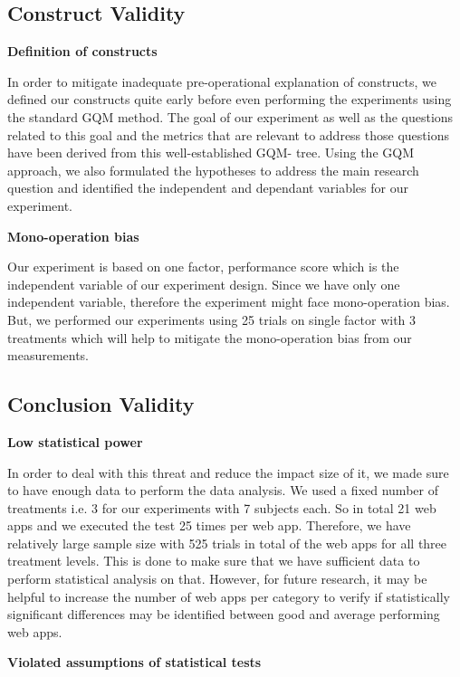 \subsection{Construct Validity}

\textbf{Definition of constructs}

In order to mitigate inadequate pre-operational explanation of constructs, we defined our constructs quite early before even performing the experiments using the standard GQM method. The goal of our experiment as well as the questions related to this goal and the metrics that are relevant to address those questions have been derived from this well-established GQM- tree. Using the GQM approach, we also formulated the hypotheses to address the main research question and identified the independent and dependant variables for our experiment. \newline

\textbf{Mono-operation bias}

Our experiment is based on one factor, performance score which is the independent variable of our experiment design. Since we have only one independent variable, therefore the experiment might face mono-operation bias. But, we performed our experiments using 25 trials on single factor with 3 treatments which will help to mitigate the mono-operation bias from our measurements.



\subsection{Conclusion Validity}

\textbf{Low statistical power}

In order to deal with this threat and reduce the impact size of it, we made sure to have enough data to perform the data analysis. We used a fixed number of treatments i.e. 3 for our experiments with 7 subjects each. So in total 21 web apps and we executed the test 25 times per web app. Therefore, we have relatively large sample size with 525 trials in total of the web apps for all three treatment levels. This is done to make sure that we have sufficient data to perform statistical analysis on that.  However, for future research, it may be helpful to increase the number of web apps per category to verify if statistically significant differences may be identified between good and average performing web apps. \newline

\textbf{Violated assumptions of statistical tests}

